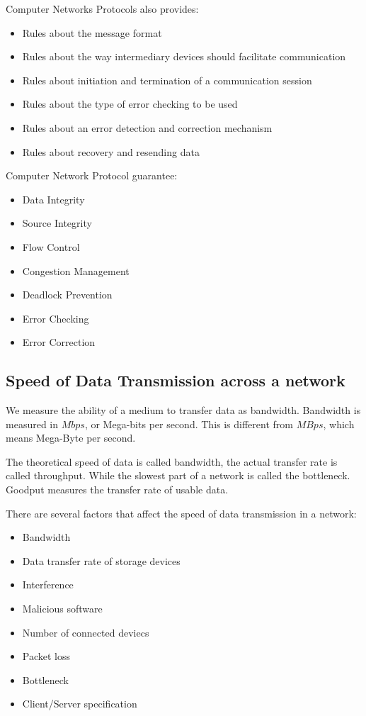 \documentclass[../notes.tex]{subfiles}
\begin{document}
Computer Networks Protocols also provides:
\begin{itemize}
	\item Rules about the message format
	\item Rules about the way intermediary devices should facilitate communication
	\item Rules about initiation and termination of a communication session
	\item Rules about the type of error checking to be used
	\item Rules about an error detection and correction mechanism
	\item Rules about recovery and resending data
\end{itemize}

Computer Network Protocol guarantee:
\begin{itemize}
	\item Data Integrity
	\item Source Integrity
	\item Flow Control
	\item Congestion Management
	\item Deadlock Prevention
	\item Error Checking
	\item Error Correction
\end{itemize}

\subsection{Speed of Data Transmission across a network}
We measure the ability of a medium to transfer data as bandwidth.
Bandwidth is measured in $Mbps$, or Mega-bits per second.
This is different from $MBps$, which means Mega-Byte per second.

The theoretical speed of data is called bandwidth, the actual transfer rate is called throughput.
While the slowest part of a network is called the bottleneck.
Goodput measures the transfer rate of usable data.

There are several factors that affect the speed of data transmission in a network:
\begin{itemize}
	\item Bandwidth
	\item Data transfer rate of storage devices
	\item Interference
	\item Malicious software
	\item Number of connected deviecs
	\item Packet loss
	\item Bottleneck
	\item Client/Server specification
\end{itemize}
\end{document}
